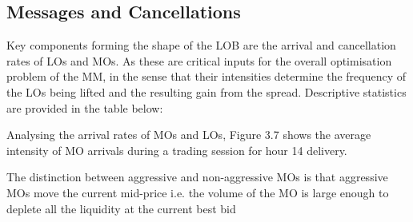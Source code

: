 \documentclass[12pt,a4paper]{cau_thesis}
\begin{document}
\subsection{Messages and Cancellations}\label{sub_sec:messages_and_cancellations}
Key components forming the shape of the LOB are the arrival and
cancellation rates of LOs and MOs. As these are critical inputs for
the overall optimisation problem of the MM, in the sense that their
intensities determine the frequency of the LOs being lifted and the
resulting gain from the spread. Descriptive statistics are provided
in the table below:
\begin{figure}[htbp]
    \vspace*{0.5cm}
    \centering
    \label{fig:num_messages_per_day}
\end{figure}
Analysing the arrival rates of MOs and LOs, Figure 3.7 shows the
average intensity of MO arrivals during a trading session for hour 14
delivery.
\begin{figure}[htbp]
    \vspace*{0.5cm}
    \centering
    \label{fig:mo_arrival_rates}
\end{figure}
The distinction between aggressive and non-aggressive MOs is that
aggressive MOs move the current mid-price i.e. the volume of the MO
is large enough to deplete all the liquidity at the current best bid
\end{document}
